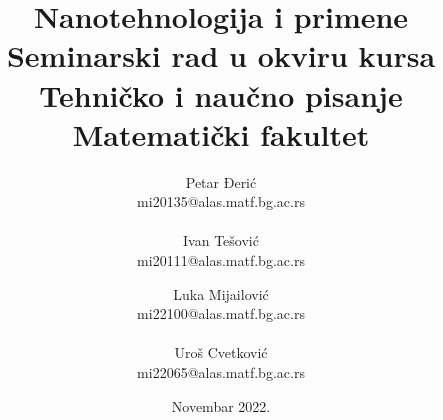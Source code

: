 \documentclass[a4paper]{article}
\begin{document}
\title{Nanotehnologija i primene\vspace{0ex}\\
\small{Seminarski rad u okviru kursa\\
Tehničko i naučno pisanje\\
Matematički fakultet}\vspace{3ex}}
\author{
Petar Đerić\\
mi20135@alas.matf.bg.ac.rs\\\\
Ivan Tešović\\
mi20111@alas.matf.bg.ac.rs\and
Luka Mijailović\\
mi22100@alas.matf.bg.ac.rs\\\\
Uroš Cvetković\\
mi22065@alas.matf.bg.ac.rs
}
\date{Novembar 2022.}

\maketitle
\end{document}
